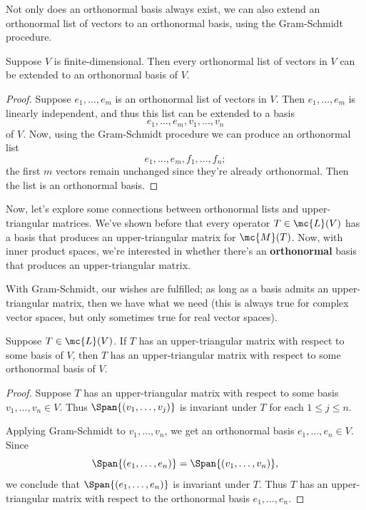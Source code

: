 \documentclass[math0540-lecture-notes.tex]{subfiles}
\begin{document}
Not only does an orthonormal basis always exist, we can also extend an orthonormal list of vectors
to an orthonormal basis, using the Gram-Schmidt procedure.
\begin{corollary}{}
  Suppose $V$ is finite-dimensional. Then every orthonormal list of vectors in $V$ can be extended
  to an orthonormal basis of $V$.
\end{corollary}
\begin{proof}[Proof]
  Suppose $e_1,\ldots,e_m$ is an orthonormal list of vectors in $V$. Then $e_1,\ldots,e_m$ is
  linearly independent, and thus this list can be extended to a basis \[
    e_1,\ldots,e_m, v_1,\ldots,v_n
  \] of $V$. Now, using the Gram-Schmidt procedure we can produce an orthonormal list \[
    e_1,\ldots,e_m,f_1,\ldots,f_n
  ;\] the first $m$ vectors remain unchanged since they're already orthonormal. Then the list is an
  orthonormal basis.
\end{proof}

Now, let's explore some connections between orthonormal lists and upper-triangular matrices. We've
shown before that every operator $T\in \mc{L}(V)$ has a basis that produces an upper-triangular
matrix for $\mc{M}(T)$. Now, with inner product spaces, we're interested in whether there's an
\textbf{orthonormal} basis that produces an upper-triangular matrix.

With Gram-Schmidt, our wishes are fulfilled; as long as a basis admits an upper-triangular matrix,
then we have what we need (this is always true for complex vector spaces, but only sometimes true
for real vector spaces).
\begin{proposition}{}
  Suppose $T\in \mc{L}(V)$. If $T$ has an upper-triangular matrix with respect to some basis of $V$,
  then $T$ has an upper-triangular matrix with respect to some orthonormal basis of $V$.
\end{proposition}
\begin{proof}[Proof]
  Suppose $T$ has an upper-triangular matrix with respect to some basis $v_1,\ldots,v_n\in V$. Thus
  $\Span{(v_1,\ldots,v_j)}$ is invariant under $T$ for each $1\le j\le n$.

  Applying Gram-Schmidt to $v_1,\ldots,v_n$, we get an orthonormal basis $e_1,\ldots,e_n\in V$.
  Since \[
    \Span{(e_1,\ldots,e_n)}=\Span{(v_1,\ldots,v_n)}
  ,\] we conclude that $\Span{(e_1,\ldots,e_n)}$ is invariant under $T$. Thus $T$ has an
  upper-triangular matrix with respect to the orthonormal basis $e_1,\ldots,e_n$.
\end{proof}
\end{document}

